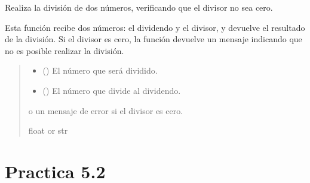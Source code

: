 \documentclass[letterpaper,10pt,spanish]{sphinxmanual}
\begin{document}
\begin{fulllineitems}
\label{\detokenize{pr5:pr5.1.dividir}}
\pysigstartsignatures
{}
\pysigstopsignatures
\sphinxAtStartPar
Realiza la división de dos números, verificando que el divisor no sea cero.

\sphinxAtStartPar
Esta función recibe dos números: el dividendo y el divisor, y devuelve el
resultado de la división. Si el divisor es cero, la función devuelve
un mensaje indicando que no es posible realizar la división.
\begin{quote}\begin{description}
\begin{itemize}
\item {} 
\sphinxAtStartPar
{} () \textendash{} El número que será dividido.

\item {} 
\sphinxAtStartPar
{} () \textendash{} El número que divide al dividendo.

\end{itemize}

\sphinxAtStartPar
\begin{description}
\sphinxAtStartPar
o un mensaje de error si el divisor es cero.

\end{description}


\sphinxAtStartPar
float or str

\end{description}\end{quote}

\end{fulllineitems}



\section{Practica 5.2}
\label{\detokenize{pr5:module-pr5.2}}\label{\detokenize{pr5:practica-5-2}}
\end{document}
